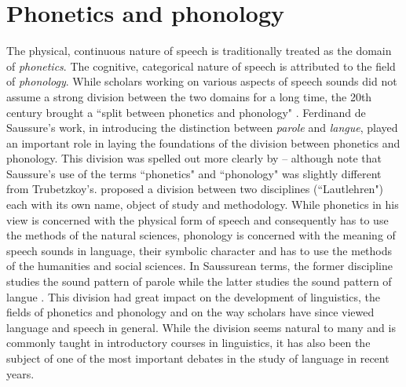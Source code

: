 \section{Phonetics and phonology}

The physical, continuous nature of speech is traditionally treated as the domain of \emph{phonetics}. The cognitive, categorical nature of speech is attributed to the field of \emph{phonology}. While scholars working on various aspects of speech sounds did not assume a strong division between the two domains for a long time, the 20th century brought a ``split between phonetics and phonology" \citep[680]{Ohala1997}. Ferdinand de Saussure's work, in introducing the distinction between \emph{parole} and \emph{langue}, played an important role in laying the foundations of the division between phonetics and phonology. This division was spelled out more clearly by \cite{Trubetzkoy1958} -- although \cite{DurandLaks2002} note that Saussure's use of the terms ``phonetics" and ``phonology" was slightly different from Trubetzkoy's. \citet[7]{Trubetzkoy1958} proposed a division between two disciplines (``Lautlehren") each with its own name, object of study and methodology. While phonetics in his view is concerned with the physical form of speech and consequently has to use the methods of the natural sciences, phonology is concerned with the meaning of speech sounds in language, their symbolic character and has to use the methods of the humanities and social sciences. In Saussurean terms, the former discipline studies the sound pattern of parole while the latter studies the sound pattern of langue \citep{Culler1986,Ladd2014}. This division had great impact on the development of linguistics, the fields of phonetics and phonology and on the way scholars have since viewed language and speech in general. While the division seems natural to many and is commonly taught in introductory courses in linguistics, it has also been the subject of one of the most important debates in the study of language in recent years.

